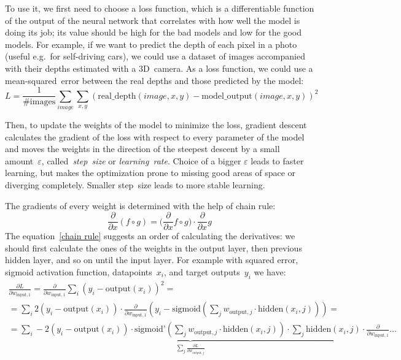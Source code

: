 To use it, we first need to choose a loss function, which is a differentiable function of the output of the neural network that correlates with how well the model is doing its job; its value should be high for the bad models and low for the good  models. For example, if we want to predict the depth of each pixel in a photo (useful e.g.~for self-driving cars), we could use a dataset of images accompanied with their depths estimated with a 3D~camera. As a loss function, we could use a mean-squared~error between the real depths and those predicted by the model:
$$
L = \frac{1}{\mbox{\# images}}\sum_{image} \sum_{x, y} (\mbox{real\_depth}(image, x, y) - \mbox{model\_output}(image, x, y))^2
$$

Then, to update the weights of the model to minimize the loss, gradient descent calculates the gradient of the loss with respect to every parameter of the model and moves the weights in the direction of the steepest descent by a small amount~$\varepsilon$, called~\emph{step~size} or \emph{learning~rate}. Choice of a bigger $\varepsilon$ leads to faster learning, but makes the optimization prone to missing good areas of space or diverging completely. Smaller step~size leads to more stable
learning.

The gradients of every weight is determined with the help of chain rule:
\begin{equation}\label{chain rule}
  \frac{\partial}{\partial x} (f \circ g) = (\frac{\partial}{\partial x} f \circ g\big) \cdot \frac{\partial}{\partial x}g
\end{equation}
The equation~\eqref{chain rule} suggests an order of calculating the derivatives: we should first calculate the ones of the weights in the output layer, then previous hidden layer, and so on until the input layer. For example with squared error, sigmoid activation function, datapoints~$x_i$, and target outputs~$y_i$ we have:
\begin{multline}
  \frac{\partial L}{\partial w_{\text{input}, 1}} = \frac{\partial}{\partial w_{\text{input}, 1}} \sum_{i} (y_i - \text{output}(x_i))^2 =\\=  \sum_{i} 2(y_i - \text{output}(x_i)) \cdot \frac{\partial}{\partial w_{\text{input}, 1}}
  ( y_i - \text{sigmoid}(\sum_j w_{\text{output}, j} \cdot \text{hidden}(x_i, j))) =\\=
  \underbrace{\sum_{i} -2(y_i - \text{output}(x_i)) \cdot \text{sigmoid'}(\sum_j w_{\text{output}, j} \cdot \text{hidden}(x_i, j)) \cdot \sum_j \text{hidden}(x_i, j)}_{\sum_j \frac{\partial L}{\partial w_{\text{output}, j}}} \cdot \frac{\partial}{\partial w_{\text{input}, 1}}\ldots
\end{multline}

